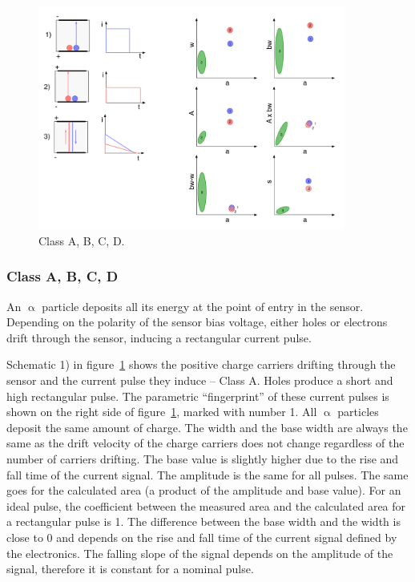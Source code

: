 \begin{figure}[h]
\centering
\includegraphics[width=0.9\textwidth]{05_current_monitoring/plots/classABCD}
\caption{Class A, B, C, D.}
\label{fig:classabcd}
\end{figure}
\clearpage
\subsubsection{Class A, B, C, D}
\label{sec:classabcd}%
An $\upalpha$ particle deposits all its energy at the point of entry in the sensor. Depending on the polarity of the sensor bias voltage, either holes or electrons drift through the sensor, inducing a rectangular current pulse. 

Schematic 1) in figure~\ref{fig:classabcd} shows the positive charge carriers drifting through the sensor and the current pulse they induce -- Class A. Holes produce a short and high rectangular pulse. The parametric ``fingerprint'' of these current pulses is shown on the right side of figure~\ref{fig:classabcd}, marked with number 1. All $\upalpha$ particles deposit the same amount of charge.
The width and the base width are always the same as the drift velocity of the charge carriers does not change regardless of the number of carriers drifting. The base value is slightly higher due to the rise and fall time of the current signal. The amplitude is the same for all pulses. The same goes for the calculated area (a product of the amplitude and base value). For an ideal pulse, the coefficient between the measured area and the calculated area for a rectangular pulse is 1. The difference between the base width and the width is close to 0 and depends on the rise and fall time of the current signal defined by the electronics. The falling slope of the signal depends on the amplitude of the signal, therefore it is constant for a nominal pulse. 


